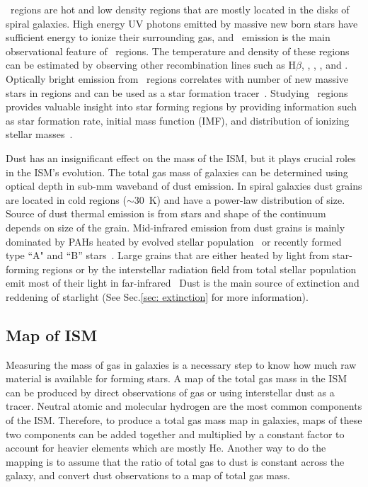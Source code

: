 \hii~regions are hot and low density regions that are mostly located in the disks of spiral galaxies.
High energy UV photons emitted by massive new born stars have sufficient energy to ionize their surrounding gas, and
~\halpha emission is the main observational feature of \hii~regions.
The temperature and density of these regions can be estimated by observing other recombination lines such as H$\beta$, \sii, \oii, \oiii, and \nii. 
Optically bright \halpha emission from \hii~regions correlates with number of new massive stars in regions and can be used as a star formation tracer~\citep[e.g.][]{Kennicutt98b,Calzetti13}. %
Studying \hii~regions provides valuable insight into star forming regions by providing information such as star formation rate, initial mass function (IMF), and distribution of ionizing stellar masses~\citep[][and references therein]{Azimlu11}.

Dust has an insignificant effect on the mass of the ISM, but it plays crucial roles in the ISM's evolution.
The total gas mass of galaxies can be determined using optical depth in sub-mm waveband of dust emission. 
In spiral galaxies dust grains are located in cold regions ($\sim 30$~K) and have a power-law distribution of size.
Source of dust thermal emission is from stars and shape of the continuum depends on size of the grain.
Mid-infrared emission from dust grains is mainly dominated by PAHs heated by evolved stellar population~\cite{Smith07a} or recently formed type ``A" and ``B'' stars~\cite{Peeters04}. %
Large grains that are either heated by light from star-forming regions or by the interstellar radiation field from total stellar population emit most of their light in far-infrared~\citep[e.g.][]{Calapa14, lu14}
Dust is the main source of extinction and reddening of starlight (See Sec.\ref{sec: extinction} for more information).

\subsection{Map of ISM} %
\label{sec: ismmap}
Measuring the mass of gas in galaxies is a necessary step to know how much raw material is available for forming stars.
A map of the total gas mass in the ISM can be produced by direct observations of gas or using interstellar dust as a tracer. 
Neutral atomic and molecular hydrogen are the most common components of the ISM. %
Therefore, to produce a total gas mass map in galaxies, maps of these two components can be added together and multiplied by a constant factor to account for heavier elements which are mostly He. %
Another way to do the mapping is to assume that the ratio of total gas to dust is constant across the galaxy, and convert dust observations to a map of total gas mass.

